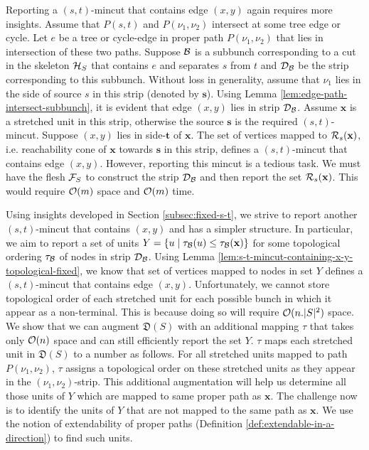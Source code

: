 
Reporting a $(s,t)$-mincut that contains edge $(x,y)$ again requires more insights. Assume that $P(s,t)$ and $P(\nu_1,\nu_2)$ intersect at some tree edge or cycle. Let $e$ be a tree or cycle-edge in proper path $P(\nu_1,\nu_2)$ that lies in intersection of these two paths. Suppose ${\cal B}$ is a subbunch corresponding to a cut in the skeleton ${\cal H}_S$ that contains $e$ and separates $s$ from $t$ and ${\cal D}_{\cal B}$ be the strip corresponding to this subbunch. Without loss in generality, assume that $\nu_1$ lies in the side of source $s$ in this strip (denoted by ${\mathbf s}$). Using Lemma \ref{lem:edge-path-intersect-subbunch}, it is evident that edge $(x,y)$ lies in strip ${\cal D}_{\cal B}$. Assume $\mathbf x$ is a stretched unit in this strip, otherwise the source $\mathbf s$ is the required $(s,t)$-mincut. Suppose $(x,y)$ lies in side-$\mathbf t$ of $\mathbf x$. The set of vertices mapped to ${\cal R}_s(\mathbf{x})$, i.e. reachability cone of $\mathbf x$ towards $\mathbf s$ in this strip, defines a $(s,t)$-mincut that contains edge $(x,y)$. However, reporting this mincut is a tedious task. We must have the flesh ${\cal F}_S$ to construct the strip ${\cal D}_{\cal B}$ and then report the set ${\cal R}_s(\mathbf{x})$. This would require ${\cal O}(m)$ space and ${\cal O}(m)$ time.



Using insights developed in Section \ref{subsec:fixed-s-t}, we strive to report another $(s,t)$-mincut that contains $(x,y)$ and has a simpler structure. In particular, we aim to report a set of units $Y = \{ u \;|\; \tau_{\cal B}(u)\leq \tau_{\cal B}(\mathbf{x})\}$ for some topological ordering $\tau_{\cal B}$ of nodes in strip ${\cal D}_{\cal B}$. Using Lemma \ref{lem:s-t-mincut-containing-x-y-topological-fixed}, we know that set of vertices mapped to nodes in set $Y$ defines a $(s,t)$-mincut that contains edge $(x,y)$. Unfortunately, we cannot store topological order of each stretched unit for each possible bunch in which it appear as a non-terminal. This is because doing so will require ${\cal O}(n.|S|^2)$ space. We show that we can augment ${\mathfrak D}(S)$ with an additional mapping $\tau$ that takes only ${\cal O}(n)$ space and can still efficiently report the set $Y$. $\tau$ maps each stretched unit in ${\mathfrak D}(S)$ to a number as follows.
For all stretched units mapped to path $P(\nu_1,\nu_2)$, $\tau$ assigns a topological order on these stretched units as they appear in the $(\nu_1,\nu_2)$-strip. This additional augmentation will help us determine all those units of $Y$ which are mapped to same proper path as $\mathbf{x}$. The challenge now is to identify the units of $Y$ that are not mapped to the same path as $\mathbf{x}$. We use the notion of extendability of proper paths (Definition \ref{def:extendable-in-a-direction}) to find such units.


